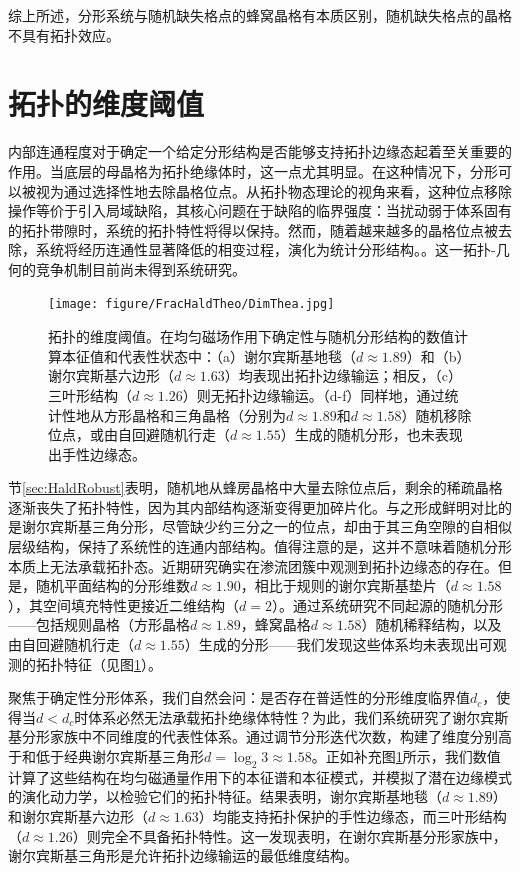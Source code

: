 综上所述，分形系统与随机缺失格点的蜂窝晶格有本质区别，随机缺失格点的晶格不具有拓扑效应。

\section{拓扑的维度阈值}
内部连通程度对于确定一个给定分形结构是否能够支持拓扑边缘态起着至关重要的作用。当底层的母晶格为拓扑绝缘体时，这一点尤其明显。在这种情况下，分形可以被视为通过选择性地去除晶格位点。从拓扑物态理论的视角来看，这种位点移除操作等价于引入局域缺陷，其核心问题在于缺陷的临界强度：当扰动弱于体系固有的拓扑带隙时，系统的拓扑特性将得以保持。然而，随着越来越多的晶格位点被去除，系统将经历连通性显著降低的相变过程，演化为统计分形结构。。这一拓扑-几何的竞争机制目前尚未得到系统研究。

\begin{figure}[htbp]
    \centering
    \texttt{[image: figure/FracHaldTheo/DimThea.jpg]}
    \caption{拓扑的维度阈值。在均匀磁场作用下确定性与随机分形结构的数值计算本征值和代表性状态中：（a）谢尔宾斯基地毯（$d \approx 1.89$）和（b）谢尔宾斯基六边形（$d \approx 1.63$）均表现出拓扑边缘输运；相反，（c）三叶形结构（$d \approx 1.26$）则无拓扑边缘输运。（d-f）同样地，通过统计性地从方形晶格和三角晶格（分别为$d \approx 1.89$和$d \approx 1.58$）随机移除位点，或由自回避随机行走（$d \approx 1.55$）生成的随机分形，也未表现出手性边缘态。
}
    \label{fig:DimThrea}
\end{figure}

节\ref{sec:HaldRobust}表明，随机地从蜂房晶格中大量去除位点后，剩余的稀疏晶格逐渐丧失了拓扑特性，因为其内部结构逐渐变得更加碎片化。与之形成鲜明对比的是谢尔宾斯基三角分形，尽管缺少约三分之一的位点，却由于其三角空隙的自相似层级结构，保持了系统性的连通内部结构。值得注意的是，这并不意味着随机分形本质上无法承载拓扑态。近期研究确实在渗流团簇中观测到拓扑边缘态的存在\cite{ivaki2022topological}。但是，随机平面结构的分形维数$d \approx 1.90$，相比于规则的谢尔宾斯基垫片（$d \approx 1.58$），其空间填充特性更接近二维结构（$d = 2$）。通过系统研究不同起源的随机分形——包括规则晶格（方形晶格$d \approx 1.89$，蜂窝晶格$d \approx 1.58$）随机稀释结构，以及由自回避随机行走（$d \approx 1.55$）生成的分形——我们发现这些体系均未表现出可观测的拓扑特征（见图\ref{fig:DimThrea}）。

聚焦于确定性分形体系，我们自然会问：是否存在普适性的分形维度临界值$d_c$，使得当$d < d_c$时体系必然无法承载拓扑绝缘体特性？为此，我们系统研究了谢尔宾斯基分形家族中不同维度的代表性体系。通过调节分形迭代次数，构建了维度分别高于和低于经典谢尔宾斯基三角形$d = \log_2 3 \approx 1.58$。正如补充图\ref{fig:DimThrea}所示，我们数值计算了这些结构在均匀磁通量作用下的本征谱和本征模式，并模拟了潜在边缘模式的演化动力学，以检验它们的拓扑特征。结果表明，谢尔宾斯基地毯（$d \approx 1.89$）和谢尔宾斯基六边形（$d \approx 1.63$）均能支持拓扑保护的手性边缘态，而三叶形结构（$d \approx 1.26$）则完全不具备拓扑特性。这一发现表明，在谢尔宾斯基分形家族中，谢尔宾斯基三角形是允许拓扑边缘输运的最低维度结构。

